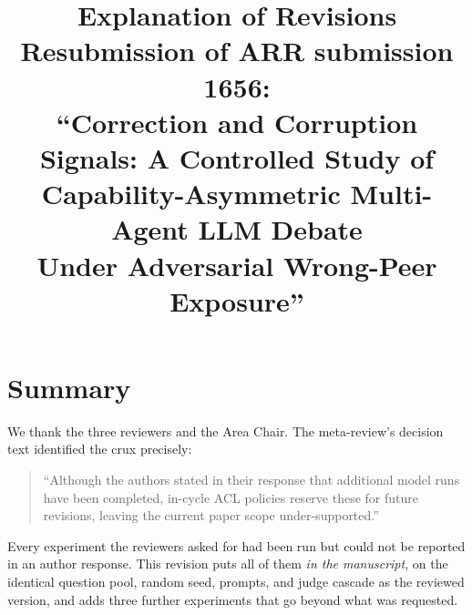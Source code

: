 \documentclass[11pt]{article}
\title{\vspace{-2em}Explanation of Revisions\\
\large Resubmission of ARR submission 1656:\\
``Correction and Corruption Signals: A Controlled Study of
Capability-Asymmetric Multi-Agent LLM Debate\\ Under Adversarial Wrong-Peer
Exposure''}
\author{}
\date{}
\begin{document}
\maketitle
\vspace{-3em}

\section*{Summary}

We thank the three reviewers and the Area Chair. The meta-review's decision
text identified the crux precisely:

\begin{quote}
``Although the authors stated in their response that additional model runs
have been completed, in-cycle ACL policies reserve these for future revisions,
leaving the current paper scope under-supported.''
\end{quote}

Every experiment the reviewers asked for had been run but could not be
reported in an author response. This revision puts all of them
\emph{in the manuscript}, on the identical question pool, random seed, prompts,
and judge cascade as the reviewed version, and adds three further experiments
that go beyond what was requested.
\end{document}
